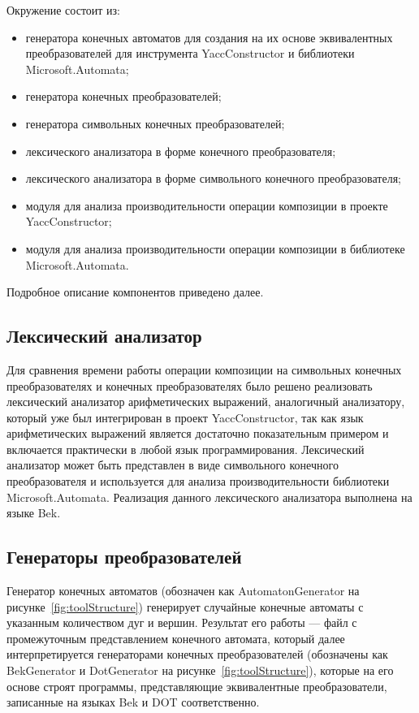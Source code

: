 \documentclass[14pt]{matmex-diploma}
\begin{document}
Окружение состоит из:
\begin{itemize}
\item генератора конечных автоматов для создания на их основе эквивалентных преобразователей для инструмента YaccConstructor и библиотеки Microsoft.Automata;
\item генератора конечных преобразователей;
\item генератора символьных конечных преобразователей;
\item лексического анализатора в форме конечного преобразователя;
\item лексического анализатора в форме символьного конечного преобразователя;
\item модуля для анализа производительности операции композиции в проекте YaccConstructor;
\item модуля для анализа производительности операции композиции в библиотеке Microsoft.Automata.
\end{itemize}
Подробное описание компонентов приведено далее.

\subsection{Лексический анализатор}
Для сравнения времени работы операции композиции на символьных конечных преобразователях и конечных преобразователях было решено реализовать лексический анализатор арифметических выражений, аналогичный анализатору, который уже был интегрирован в проект YaccConstructor, так как язык арифметических выражений является достаточно показательным примером и включается практически в любой язык программирования.  Лексический анализатор может быть представлен в виде символьного конечного преобразователя и используется для анализа производительности библиотеки Microsoft.Automata. Реализация данного лексического анализатора выполнена на языке Bek.

\subsection{Генераторы преобразователей}
Генератор конечных автоматов (обозначен как AutomatonGenerator на рисунке~\ref{fig:toolStructure}) генерирует случайные конечные автоматы с указанным количеством дуг и вершин. Результат его работы --- файл с промежуточным представлением конечного автомата, который далее интерпретируется генераторами конечных преобразователей (обозначены как BekGenerator и DotGenerator на рисунке~\ref{fig:toolStructure}), которые на его основе строят программы, представляющие эквивалентные преобразователи, записанные на языках Bek и DOT соответственно. 
\end{document}
